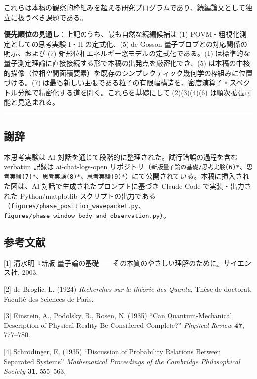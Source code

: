 \documentclass[
]{ltjsarticle}
\begin{document}
これらは本稿の観察的枠組みを超える研究プログラムであり、続編論文として独立に扱うべき課題である。

\textbf{優先順位の見通し}：上記のうち、最も自然な続編候補は (1)
POVM・粗視化測定としての思考実験 I・II の定式化、(5) de Gosson
量子ブロブとの対応関係の明示、および (7)
矩形位相エネルギー窓モデルの定式化である。(1)
は標準的な量子測定理論に直接接続する形で本稿の出発点を厳密化でき、(5)
は本稿の中核的描像（位相空間面積要素）を既存のシンプレクティック幾何学の枠組みに位置づける。(7)
は最も新しい主張である粒子の有限幅構造を、密度演算子・スペクトル分解で精密化する道を開く。これらを基礎にして
(2)(3)(4)(6) は順次拡張可能と見込まれる。

\begin{center}\rule{0.5\linewidth}{0.5pt}\end{center}

\subsection{謝辞}\label{ux8b1dux8f9e}

本思考実験は AI 対話を通じて段階的に整理された。試行錯誤の過程を含む
verbatim 記録は ai-chat-logs-open
リポジトリ（\texttt{新版量子論の基礎/思考実験(6)*}、\texttt{思考実験(7)*}、\texttt{思考実験(8)*}、\texttt{思考実験(9)*}）にて公開されている。本稿に挿入された図は、AI
対話で生成されたプロンプトに基づき Claude Code で実装・出力された
Python/matplotlib
スクリプトの出力である（\texttt{figures/phase\_position\_wavepacket.py}、\texttt{figures/phase\_window\_body\_and\_observation.py}）。

\subsection{参考文献}\label{ux53c2ux8003ux6587ux732e}

{[}1{]} 清水明『新版
量子論の基礎------その本質のやさしい理解のために』サイエンス社, 2003.

{[}2{]} de Broglie, L. (1924) \emph{Recherches sur la théorie des
Quanta}, Thèse de doctorat, Faculté des Sciences de Paris.

{[}3{]} Einstein, A., Podolsky, B., Rosen, N. (1935) ``Can
Quantum-Mechanical Description of Physical Reality Be Considered
Complete?'' \emph{Physical Review} \textbf{47}, 777--780.

{[}4{]} Schrödinger, E. (1935) ``Discussion of Probability Relations
Between Separated Systems'' \emph{Mathematical Proceedings of the
Cambridge Philosophical Society} \textbf{31}, 555--563.
\end{document}
